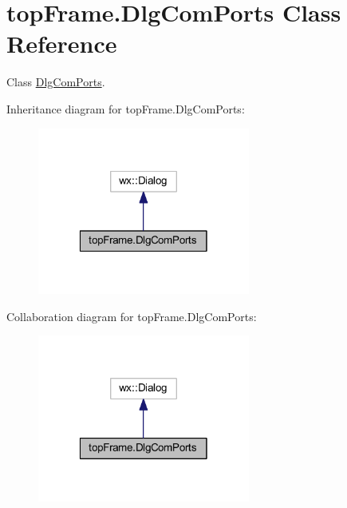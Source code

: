 \hypertarget{classtop_frame_1_1_dlg_com_ports}{\section{top\-Frame.\-Dlg\-Com\-Ports Class Reference}
\label{classtop_frame_1_1_dlg_com_ports}
}


Class \hyperlink{classtop_frame_1_1_dlg_com_ports}{Dlg\-Com\-Ports}.  




Inheritance diagram for top\-Frame.\-Dlg\-Com\-Ports\-:
\nopagebreak
\begin{figure}[H]
\begin{center}
\leavevmode
\includegraphics[width=198pt]{classtop_frame_1_1_dlg_com_ports__inherit__graph}
\end{center}
\end{figure}


Collaboration diagram for top\-Frame.\-Dlg\-Com\-Ports\-:
\nopagebreak
\begin{figure}[H]
\begin{center}
\leavevmode
\includegraphics[width=198pt]{classtop_frame_1_1_dlg_com_ports__coll__graph}
\end{center}
\end{figure}
